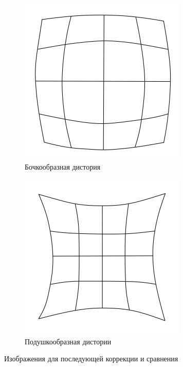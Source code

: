 \documentclass[a4paper, 16pt]{article}
\begin{document}
\begin{figure}[!htb]
\begin{subfigure}[b]{0.3\textwidth}
        \includegraphics[width=\textwidth]{barbarrel.png}
        \caption{Бочкообразная дистория}
        \label{fig:barreled}
    \end{subfigure}
    \hfill
    \begin{subfigure}[b]{0.3\textwidth}
        \centering
        \includegraphics[width=\textwidth]{pipillow.png}
        \caption{Подушкообразная дистории}
        \label{fig:pillowed}
    \end{subfigure}
    \caption{Изображения для последующей коррекции и сравнения}
    \label{fig:origbarpil}
\end{figure}
\end{document}
